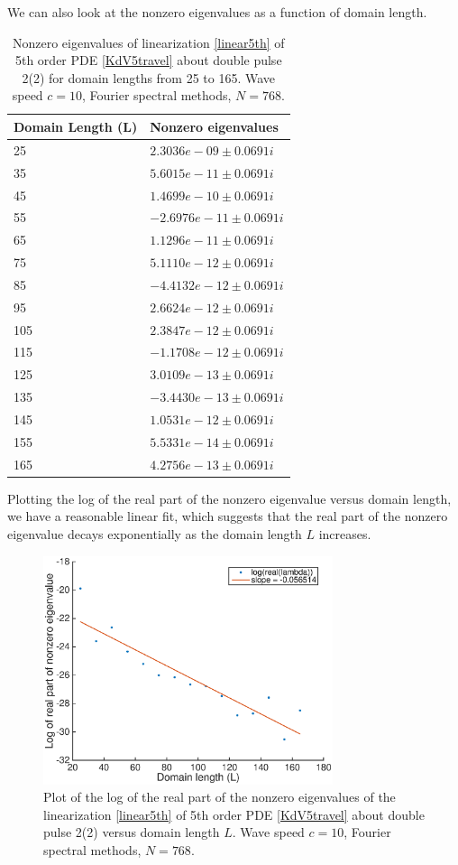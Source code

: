 \documentclass[12pt]{article}
\begin{document}
We can also look at the nonzero eigenvalues as a function of domain length.

\begin{table}[H]
\begin{tabular}{l|l}
Domain Length (L)  & Nonzero eigenvalues \\ \hline
    25 &  $  2.3036e-09 \pm 0.0691i$   \\
    35 &  $  5.6015e-11 \pm 0.0691i$   \\
    45 &  $  1.4699e-10 \pm 0.0691i$   \\
    55 &  $ -2.6976e-11 \pm 0.0691i$   \\
    65 &  $  1.1296e-11 \pm 0.0691i$   \\
    75 &  $  5.1110e-12 \pm 0.0691i$   \\
    85 &  $ -4.4132e-12 \pm 0.0691i$   \\
    95 &  $  2.6624e-12 \pm 0.0691i$   \\
   105 &  $  2.3847e-12 \pm 0.0691i$   \\
   115 &  $ -1.1708e-12 \pm 0.0691i$   \\
   125 &  $  3.0109e-13 \pm 0.0691i$   \\
   135 &  $ -3.4430e-13 \pm 0.0691i$   \\
   145 &  $  1.0531e-12 \pm 0.0691i$   \\
   155 &  $  5.5331e-14 \pm 0.0691i$   \\
   165 &  $  4.2756e-13 \pm 0.0691i$   \\
\end{tabular}
\caption{Nonzero eigenvalues of linearization \eqref{linear5th} of 5th order PDE \eqref{KdV5travel} about double pulse 2(2) for domain lengths from 25 to 165. Wave speed $c = 10$, Fourier spectral methods, $N = 768$.}
\end{table}

Plotting the log of the real part of the nonzero eigenvalue versus domain length, we have a reasonable linear fit, which suggests that the real part of the nonzero eigenvalue decays exponentially as the domain length $L$ increases.

\begin{figure}[H]
	\includegraphics[width=8.5cm]{expdecayL}
	\caption{Plot of the log of the real part of the nonzero eigenvalues of the linearization \eqref{linear5th} of 5th order PDE \eqref{KdV5travel} about double pulse 2(2) versus domain length $L$. Wave speed $c = 10$, Fourier spectral methods, $N = 768$.}
\end{figure}
\end{document}
